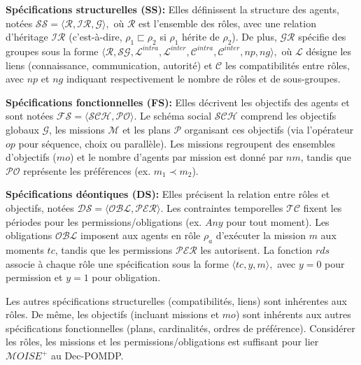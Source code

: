 \documentclass[dissemination]{jfsma}
\begin{document}
\noindent \textbf{Spécifications structurelles (SS):}
Elles définissent la structure des agents, notées
$
\mathcal{SS} = \langle \mathcal{R}, \mathcal{IR}, \mathcal{G} \rangle,
$
où \(\mathcal{R}\) est l'ensemble des rôles, avec une relation d'héritage \(\mathcal{IR}\) (c'est-à-dire, \(\rho_1 \sqsubset \rho_2\) si \(\rho_1\) hérite de \(\rho_2\)). De plus, \(\mathcal{GR}\) spécifie des groupes sous la forme 
$
\langle \mathcal{R}, \mathcal{SG}, \mathcal{L}^{intra}, \mathcal{L}^{inter}, \mathcal{C}^{intra}, \mathcal{C}^{inter}, np, ng \rangle,
$
où \(\mathcal{L}\) désigne les liens (connaissance, communication, autorité) et \(\mathcal{C}\) les compatibilités entre rôles, avec \(np\) et \(ng\) indiquant respectivement le nombre de rôles et de sous-groupes.

\vspace{0.5em}
\noindent \textbf{Spécifications fonctionnelles (FS):}
Elles décrivent les objectifs des agents et sont notées
$
\mathcal{FS} = \langle \mathcal{SCH}, \mathcal{PO} \rangle.
$
Le schéma social \(\mathcal{SCH}\) comprend les objectifs globaux \(\mathcal{G}\), les missions \(\mathcal{M}\) et les plans \(\mathcal{P}\) organisant ces objectifs (via l'opérateur \(op\) pour séquence, choix ou parallèle). Les missions regroupent des ensembles d'objectifs (\(mo\)) et le nombre d'agents par mission est donné par \(nm\), tandis que \(\mathcal{PO}\) représente les préférences (ex. \(m_1 \prec m_2\)).

\vspace{0.5em}
\noindent \textbf{Spécifications déontiques (DS):}
Elles précisent la relation entre rôles et objectifs, notées
$
\mathcal{DS} = \langle \mathcal{OBL}, \mathcal{PER} \rangle.
$
Les contraintes temporelles \(\mathcal{TC}\) fixent les périodes pour les permissions/obligations (ex. \(Any\) pour tout moment). Les obligations \(\mathcal{OBL}\) imposent aux agents en rôle \(\rho_a\) d'exécuter la mission \(m\) aux moments \(tc\), tandis que les permissions \(\mathcal{PER}\) les autorisent. La fonction \(rds\) associe à chaque rôle une spécification sous la forme 
$
\langle tc, y, m \rangle,
$
avec \(y=0\) pour permission et \(y=1\) pour obligation.


Les autres spécifications structurelles (compatibilités, liens) sont inhérentes aux rôles. De même, les objectifs (incluant missions et \(mo\)) sont inhérents aux autres spécifications fonctionnelles (plans, cardinalités, ordres de préférence). Considérer les rôles, les missions et les permissions/obligations est suffisant pour lier \(\mathcal{M}OISE^+\) au Dec-POMDP.
\end{document}
